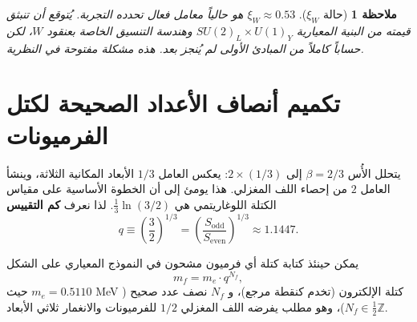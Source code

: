 \documentclass[12pt,a4paper]{article}
\newtheorem{remark}[theorem]{ملاحظة}
\begin{document}
	\begin{remark}[حالة \(\xi_W\)]
		\(\xi_W \approx 0.53\) هو حالياً معامل فعال تحدده التجربة. يُتوقع أن تنبثق قيمته من البنية المعيارية \(SU(2)_L \times U(1)_Y\) وهندسة التنسيق الخاصة بعنقود \(W\)، لكن حساباً كاملاً من المبادئ الأولى لم يُنجز بعد. هذه مشكلة مفتوحة في النظرية.
	\end{remark}
	
	\section{تكميم أنصاف الأعداد الصحيحة لكتل الفرميونات}
	
	يتحلل الأُس \(\beta = 2/3\) إلى \(2 \times (1/3)\): يعكس العامل \(1/3\) الأبعاد المكانية الثلاثة، وينشأ العامل \(2\) من إحصاء اللف المغزلي. هذا يومئ إلى أن الخطوة الأساسية على مقياس الكتلة اللوغاريتمي هي \(\frac{1}{3}\ln(3/2)\). لذا نعرف \textbf{كم التقييس}
	\begin{equation}
		q \equiv \left(\frac{3}{2}\right)^{1/3} = \left(\frac{S_{\mathrm{odd}}}{S_{\mathrm{even}}}\right)^{1/3} \approx 1.1447.
	\end{equation}
	
	يمكن حينئذ كتابة كتلة أي فرميون مشحون في النموذج المعياري على الشكل
	\begin{equation}
		\boxed{m_f = m_e \cdot q^{N_f}},
		\label{eq:mass-quantization}
	\end{equation}
	حيث \(m_e = 0.5110\) MeV كتلة الإلكترون (تخدم كنقطة مرجع)، و \(N_f\) نصف عدد صحيح (\(N_f \in \frac{1}{2}\mathbb{Z}\))، وهو مطلب يفرضه اللف المغزلي \(1/2\) للفرميونات والانغمار ثلاثي الأبعاد.
	
\end{document}
